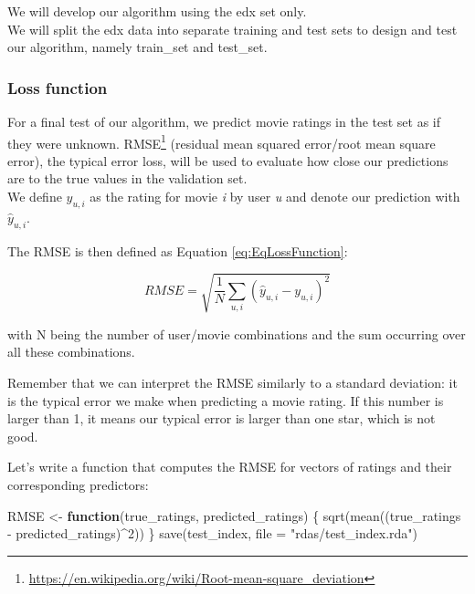 \documentclass[
]{article}
\newenvironment{Shaded}{}{}
\newcommand{\AttributeTok}[1]{\textcolor[rgb]{0.49,0.56,0.16}{#1}}
\newcommand{\ControlFlowTok}[1]{\textcolor[rgb]{0.00,0.44,0.13}{\textbf{#1}}}
\newcommand{\DecValTok}[1]{\textcolor[rgb]{0.25,0.63,0.44}{#1}}
\newcommand{\FunctionTok}[1]{\textcolor[rgb]{0.02,0.16,0.49}{#1}}
\newcommand{\NormalTok}[1]{#1}
\newcommand{\OtherTok}[1]{\textcolor[rgb]{0.00,0.44,0.13}{#1}}
\newcommand{\SpecialCharTok}[1]{\textcolor[rgb]{0.25,0.44,0.63}{#1}}
\newcommand{\StringTok}[1]{\textcolor[rgb]{0.25,0.44,0.63}{#1}}
\DeclareRobustCommand{\href}[2]{#2\footnote{\url{#1}}}
\begin{document}
We will develop our algorithm using the edx set only.\\
We will split the edx data into separate training and test sets to
design and test our algorithm, namely train\_set and test\_set.

\hypertarget{loss-function}{%
\subsubsection{Loss function}\label{loss-function}}

For a final test of our algorithm, we predict movie ratings in the test
set as if they were unknown.
\href{https://en.wikipedia.org/wiki/Root-mean-square_deviation}{RMSE}
(residual mean squared error/root mean square error), the typical error
loss, will be used to evaluate how close our predictions are to the true
values in the validation set.\\
We define \({y_{u,i}}\) as the rating for movie \emph{i} by user
\emph{u} and denote our prediction with \({\hat{y}_{u,i}}\).

The RMSE is then defined as Equation \ref{eq:EqLossFunction}:

%
\par

\label{eq:EqLossFunction} \begin{equation}
  RMSE=\sqrt{\frac{1}{N}\sum_{u,i}(\hat{y}_{u,i}-y_{u,i})^{2}}
\end{equation}

with N being the number of user/movie combinations and the sum occurring
over all these combinations.

Remember that we can interpret the RMSE similarly to a standard
deviation: it is the typical error we make when predicting a movie
rating. If this number is larger than 1, it means our typical error is
larger than one star, which is not good.

Let's write a function that computes the RMSE for vectors of ratings and
their corresponding predictors:

\begin{Shaded}
\begin{Highlighting}[]
\NormalTok{RMSE }\OtherTok{\textless{}{-}} \ControlFlowTok{function}\NormalTok{(true\_ratings, predicted\_ratings) \{}
    \FunctionTok{sqrt}\NormalTok{(}\FunctionTok{mean}\NormalTok{((true\_ratings }\SpecialCharTok{{-}}\NormalTok{ predicted\_ratings)}\SpecialCharTok{\^{}}\DecValTok{2}\NormalTok{))}
\NormalTok{\}}
\FunctionTok{save}\NormalTok{(test\_index, }\AttributeTok{file =} \StringTok{"rdas/test\_index.rda"}\NormalTok{)}
\end{Highlighting}
\end{Shaded}
\end{document}
